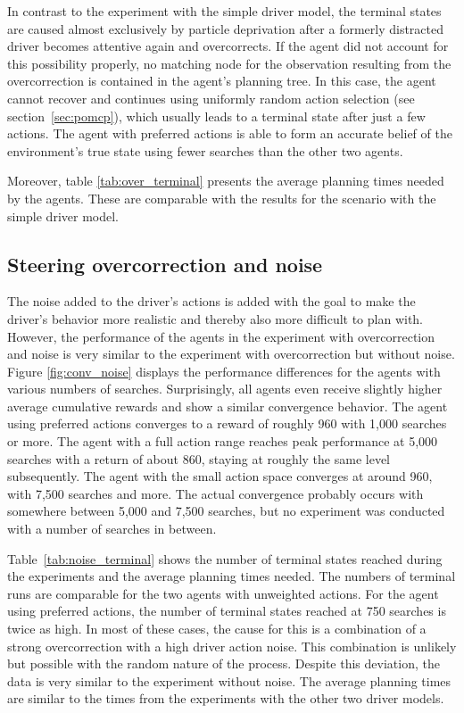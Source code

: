   

In contrast to the experiment with the simple driver model, the terminal states are caused almost exclusively by particle deprivation after a formerly distracted driver becomes attentive again and overcorrects. If the agent did not account for this possibility properly, no matching node for the observation resulting from the overcorrection is contained in the agent's planning tree. In this case, the agent cannot recover and continues using uniformly random action selection (see section~\ref{sec:pomcp}), which usually leads to a terminal state after just a few actions. The agent with preferred actions is able to form an accurate belief of the environment's true state using fewer searches than the other two agents.

Moreover, table \ref{tab:over_terminal} presents the average planning times needed by the agents. These are comparable with the results for the scenario with the simple driver model.

\subsection{Steering overcorrection and noise}

The noise added to the driver's actions is added with the goal to make the driver's behavior more realistic and thereby also more difficult to plan with. However, the performance of the agents in the experiment with overcorrection and noise is very similar to the experiment with overcorrection but without noise. Figure \ref{fig:conv_noise} displays the performance differences for the agents with various numbers of searches. Surprisingly, all agents even receive slightly higher average cumulative rewards and show a similar convergence behavior. The agent using preferred actions converges to a reward of roughly 960 with 1,000 searches or more. The agent with a full action range reaches peak performance at 5,000 searches with a return of about 860, staying at roughly the same level subsequently. The agent with the small action space converges at around 960, with 7,500 searches and more. The actual convergence probably occurs with somewhere between 5,000 and 7,500 searches, but no experiment was conducted with a number of searches in between.



\noindent
Table~\ref{tab:noise_terminal} shows the number of terminal states reached during the experiments and the average planning times needed. The numbers of terminal runs are comparable for the two agents with unweighted actions. For the agent using preferred actions, the number of terminal states reached at 750 searches is twice as high. In most of these cases, the cause for this is a combination of a strong overcorrection with a high driver action noise. This combination is unlikely but possible with the random nature of the process. Despite this deviation, the data is very similar to the experiment without noise. The average planning times are similar to the times from the experiments with the other two driver models.

